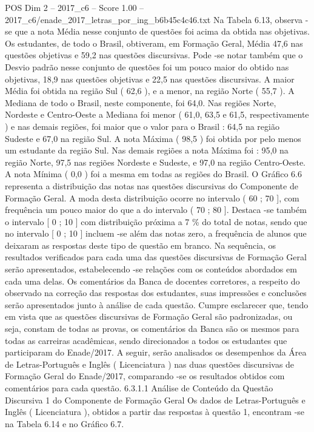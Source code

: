 \begin{textsample}{POS Dim 2 – 2017\_c6 – Score 1.00 – 2017\_c6/enade\_2017\_letras\_por\_ing\_b6b45c4c46.txt}
Na Tabela 6.13, observa -se que a nota Média nesse conjunto de questões foi acima da obtida nas objetivas.
Os estudantes, de todo o Brasil, obtiveram, em Formação Geral, Média 47,6 nas questões objetivas e 59,2 nas questões discursivas.
Pode -se notar também que o Desvio padrão nesse conjunto de questões foi um pouco maior do obtido nas objetivas, 18,9 nas questões objetivas e 22,5 nas questões discursivas.
A maior Média foi obtida na região Sul ( 62,6 ), e a menor, na região Norte ( 55,7 ).
A Mediana de todo o Brasil, neste componente, foi 64,0.
Nas regiões Norte, Nordeste e Centro-Oeste a Mediana foi menor ( 61,0, 63,5 e 61,5, respectivamente ) e nas demais regiões, foi maior que o valor para o Brasil : 64,5 na região Sudeste e 67,0 na região Sul.
A nota Máxima ( 98,5 ) foi obtida por pelo menos um estudante da região Sul.
Nas demais regiões a nota Máxima foi : 95,0 na região Norte, 97,5 nas regiões Nordeste e Sudeste, e 97,0 na região Centro-Oeste.
A nota Mínima ( 0,0 ) foi a mesma em todas as regiões do Brasil.
O Gráfico 6.6 representa a distribuição das notas nas questões discursivas do Componente de Formação Geral.
A moda desta distribuição ocorre no intervalo ( 60 ; 70 ], com frequência um pouco maior do que a do intervalo ( 70 ; 80 ].
Destaca -se também o intervalo [ 0 ; 10 ] com distribuição próxima a 7 \% do total de notas, sendo que no intervalo [ 0 ; 10 ] incluem -se além das notas zero, a frequência de alunos que deixaram as respostas deste tipo de questão em branco.
Na sequência, os resultados verificados para cada uma das questões discursivas de Formação Geral serão apresentados, estabelecendo -se relações com os conteúdos abordados em cada uma delas.
Os comentários da Banca de docentes corretores, a respeito do observado na correção das respostas dos estudantes, suas impressões e conclusões serão apresentados junto à análise de cada questão.
Cumpre esclarecer que, tendo em vista que as questões discursivas de Formação Geral são padronizadas, ou seja, constam de todas as provas, os comentários da Banca são os mesmos para todas as carreiras acadêmicas, sendo direcionados a todos os estudantes que participaram do Enade/2017.
A seguir, serão analisados os desempenhos da Área de Letras-Português e Inglês ( Licenciatura ) nas duas questões discursivas de Formação Geral do Enade/2017, comparando -se os resultados obtidos com comentários para cada questão. 6.3.1.1 Análise de Conteúdo da Questão Discursiva 1 do Componente de Formação Geral Os dados de Letras-Português e Inglês ( Licenciatura ), obtidos a partir das respostas à questão 1, encontram -se na Tabela 6.14 e no Gráfico 6.7.

\end{textsample}

